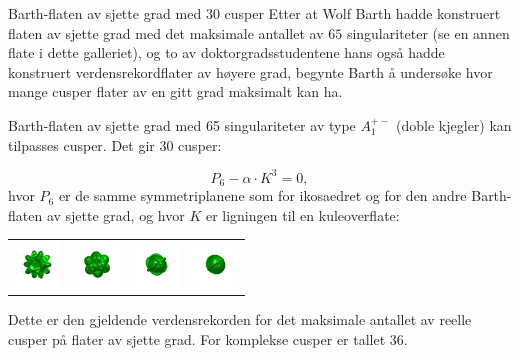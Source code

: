 \begin{surferPage}{Barth-flaten av sjette grad med 30 cusper} 
Etter at Wolf Barth hadde konstruert flaten av sjette grad med det maksimale antallet av $65$ singulariteter (se en annen flate i dette galleriet), og to av doktorgradsstudentene hans også hadde konstruert verdensrekordflater av høyere grad, begynte Barth å undersøke hvor mange cusper flater av en gitt grad maksimalt kan ha.  

   Barth-flaten av sjette grad med 65 singulariteter av type $A_1^{+-}$ (doble kjegler) kan tilpasses cusper. Det gir 30 cusper: 
   
    \[P_6 - \alpha \cdot K^3=0,\]
  hvor $P_6$ er de samme symmetriplanene som for ikosaedret og for den andre Barth-flaten av sjette grad, og hvor $K$ er ligningen til en kuleoverflate:
    \vspace*{-0.4em}
    \begin{center}
      \begin{tabular}{c@{\ }c@{\ }c@{\ }c}
        \includegraphics[height=1.2cm]{./../../common/images/barthsextic_30A2}
        &
        \includegraphics[height=1.2cm]{./../../common/images/barthsextic_30A2_3}
        &
        \includegraphics[height=1.2cm]{./../../common/images/barthsextic_30A2_5}
        &
        \includegraphics[height=1.2cm]{./../../common/images/barthsextic_30A2_6}
      \end{tabular}
    \end{center}    
    \vspace*{-0.3em}
   Dette er den gjeldende verdensrekorden for det maksimale antallet av reelle cusper på flater av sjette grad. For komplekse cusper er tallet $36$.
\end{surferPage}
